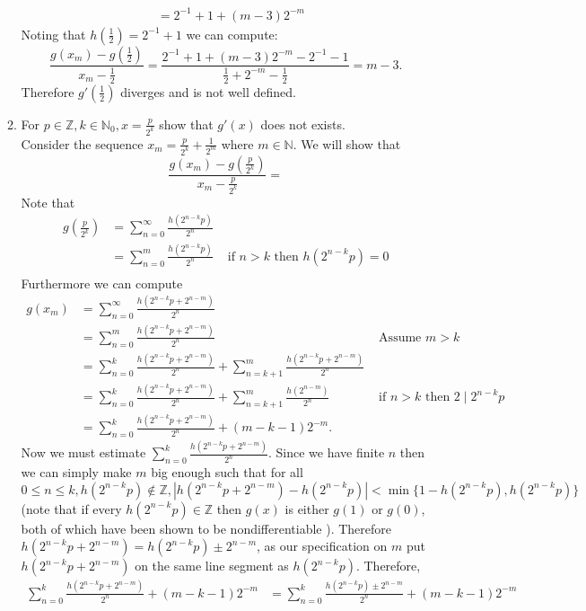 \documentclass[12pt, letterpaper]{article}
\newcommand{\Z}{\mathbb{Z}}
\newcommand{\N}{\mathbb{N}}
\begin{document}
\begin{enumerate}
\begin{enumerate}
\begin{align*}
			&= 2^{-1} + 1 + (m-3)2^{-m}
		\end{align*}
		Noting that $h(\frac{1}{2}) = 2^{-1} + 1$ we can compute:
		$$
		\frac{g(x_m)-g(\frac{1}{2})}{x_m - \frac{1}{2}} = \frac{2^{-1} + 1 + (m-3)2^{-m} - 2^{-1} - 1}{\frac{1}{2} + 2^{-m} - \frac{1}{2}} = m - 3.
		$$
		Therefore $g'(\frac{1}{2})$ diverges and is not well defined.  
		\item For $p \in \Z, k \in \N_0, x = \frac{p}{2^k}$ show that $g'(x)$ does not exists. \\
		Consider the sequence $x_m = \frac{p}{2^k} + \frac{1}{2^m}$ where $m \in \N$.  We will show that
		$$
		\frac{g(x_m)-g(\frac{p}{2^k})}{x_m - \frac{p}{2^k}} = 
		$$ 		
		Note that 
		\begin{align*}
		g(\frac{p}{2^k}) &= \sum_{n=0}^\infty \frac{h(2^{n-k}p)}{2^n}\\
		&= \sum_{n=0}^m \frac{h(2^{n-k}p)}{2^n} & \text{ if $n > k$ then $h(2^{n-k}p) = 0$}\\
		\end{align*}
		Furthermore we can compute 
		\begin{align*}
		g(x_m) &=  \sum_{n=0}^\infty \frac{h(2^{n-k}p + 2^{n-m})}{2^n}\\
		&=  \sum_{n=0}^m \frac{h(2^{n-k}p + 2^{n-m})}{2^n} & \text{ Assume $m > k$}\\
		&= \sum_{n=0}^k \frac{h(2^{n-k}p + 2^{n-m})}{2^n} + \sum_{n=k+1}^m \frac{h(2^{n-k}p + 2^{n-m})}{2^n}\\
		&= \sum_{n=0}^k \frac{h(2^{n-k}p + 2^{n-m})}{2^n} + \sum_{n=k+1}^m \frac{h(2^{n-m})}{2^n} & 
		\text{ if $n > k$ then $2\mid 2^{n-k}p$ }\\
		&= \sum_{n=0}^k \frac{h(2^{n-k}p + 2^{n-m})}{2^n} + (m-k-1)2^{-m}.
\end{align*}				 
		Now we must estimate $\sum_{n=0}^k \frac{h(2^{n-k}p + 2^{n-m})}{2^n}$.  Since we have finite $n$ then we can 
		simply make $m$ big enough such that for all $0\leq n \leq k,h(2^{n-k}p) \not \in \Z , |h(2^{n-k}p + 2^{n-m}) - h(2^{n-k}p)| < \min\{1-h(2^{n-k}p),h(2^{n-k}p)\}$ (note that if every $h(2^{n-k}p) \in \Z $ then $g(x)$ is either $g(1)$ or $g(0)$, both of which have been shown to be nondifferentiable ).  Therefore $h(2^{n-k}p + 2^{n-m}) = h(2^{n-k}p) \pm 2^{n-m}$, as 
		our specification on $m$ put $h(2^{n-k}p + 2^{n-m})$ on the same line segment as $h(2^{n-k}p)$.
		Therefore, 
		\begin{align*}
		\sum_{n=0}^k \frac{h(2^{n-k}p + 2^{n-m})}{2^n} + (m-k-1)2^{-m} &= 
		\sum_{n=0}^k \frac{h(2^{n-k}p)\pm 2^{n-m}}{2^n} + (m-k-1)2^{-m}\\

\end{align*}
\end{enumerate}
\end{enumerate}
\end{document}
